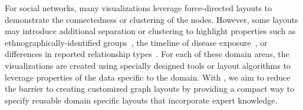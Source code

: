 For social networks, many visualizations leverage force-directed layouts
to demonstrate the connectedness or clustering of the nodes. However, some
layouts may introduce additional separation or clustering
to highlight properties such as ethnographically-identified
groups~\cite{rothenberg1998using},
the timeline of disease
exposure~\cite{fitzpatrick2001preventable,mcelroy2003network},
or differences in reported relationship types~\cite{fu2011hiv}.
For each of these domain areas, the visualizations are created using specially
designed tools or layout algorithms to leverage properties of the data
specific to the domain. With \projectname, we aim to reduce the barrier to
creating customized graph layouts by providing a compact way to specify
reusable domain specific layouts that incorporate expert knowledge.





